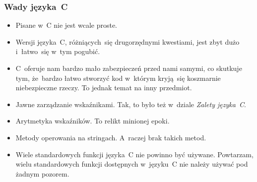 \documentclass[10pt,t]{beamer}
\begin{document}
\begin{frame}
  \frametitle{Wady języka~C}


  \begin{itemize}

  \item Pisane w~C nie jest wcale proste.

  \item Wersji języka~C, różniących~się drugorzędnymi kwestiami, jest
    zbyt dużo i~łatwo~się w~tym pogubić.

  \item C~oferuje nam bardzo mało zabezpieczeń przed nami samymi, co
    skutkuje tym, że~bardzo łatwo stworzyć kod w~którym kryją~się
    koszmarnie niebezpieczne rzeczy. To jednak temat na inny przedmiot.

  \item Jawne zarządzanie wskaźnikami. Tak, to było też w~dziale
    \textit{Zalety języka~C}.

  \item Arytmetyka wskaźników. To relikt minionej epoki.

  \item Metody operowania na stringach. A~raczej brak takich metod.

  \item Wiele standardowych funkcji języka~C \alert{nie} powinno być
    używane. Powtarzam, wielu standardowych funkcji dostępnych w~języku~C
    \alert{nie należy} używać pod żadnym pozorem.

  \end{itemize}

\end{frame}
\end{document}
